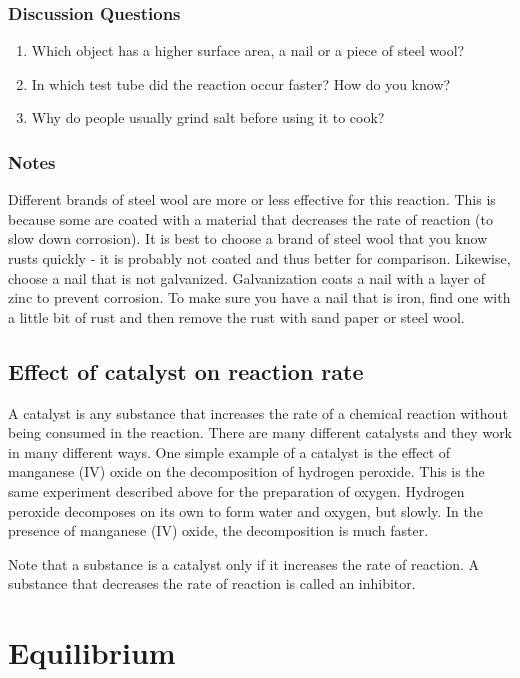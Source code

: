 \subsubsection*{Discussion Questions}
\begin{enumerate}
\item{Which object has a higher surface area, a nail or a piece of steel wool?}
\item{In which test tube did the reaction occur faster? How do you know?}
\item{Why do people usually grind salt before using it to cook?}
\end{enumerate}

\subsubsection*{Notes}
Different brands of steel wool are more or less effective for this reaction. This is because some are coated with a material that decreases the rate of reaction (to slow down corrosion). It is best to choose a brand of steel wool that you know rusts quickly - it is probably not coated and thus better for comparison. Likewise, choose a nail that is not galvanized. Galvanization coats a nail with a layer of zinc to prevent corrosion. To make sure you have a nail that is iron, find one with a little bit of rust and then remove the rust with sand paper or steel wool.

\subsection{Effect of catalyst on reaction rate}

A catalyst is any substance that increases the rate of a chemical reaction without being consumed in the reaction. There are many different catalysts and they work in many different ways. One simple example of a catalyst is the effect of manganese (IV) oxide on the decomposition of hydrogen peroxide. This is the same experiment described above for the preparation of oxygen. Hydrogen peroxide decomposes on its own to form water and oxygen, but slowly. In the presence of manganese (IV) oxide, the decomposition is much faster.

Note that a substance is a catalyst only if it increases the rate of reaction. A substance that decreases the rate of reaction is called an inhibitor.

\section{Equilibrium}


